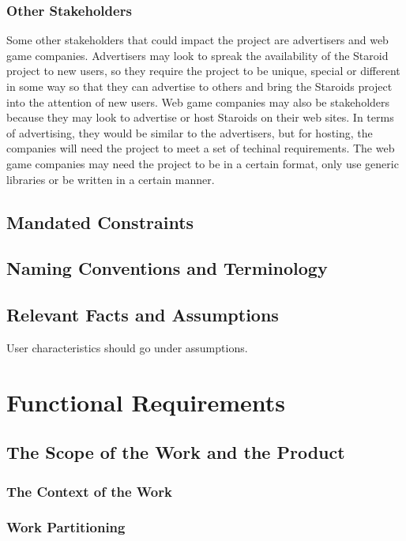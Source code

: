 \documentclass[12pt, titlepage]{article}
\begin{document}
\subsubsection{Other Stakeholders}
Some other stakeholders that could impact the project are advertisers and web game companies. Advertisers may look to spreak the availability of the Staroid project to new users, so they require the project to be unique, special or different in some way so that they can advertise to others and bring the Staroids project into the attention of new users. Web game companies may also be stakeholders because they may look to advertise or host Staroids on their web sites. In terms of advertising, they would be similar to the advertisers, but for hosting, the companies will need the project to meet a set of techinal requirements. The web game companies may need the project to be in a certain format, only use generic libraries or be written in a certain manner.\\

\subsection{Mandated Constraints}

\subsection{Naming Conventions and Terminology}

\subsection{Relevant Facts and Assumptions}

User characteristics should go under assumptions.

\section{Functional Requirements}

\subsection{The Scope of the Work and the Product}

\subsubsection{The Context of the Work}

\subsubsection{Work Partitioning}
\end{document}

